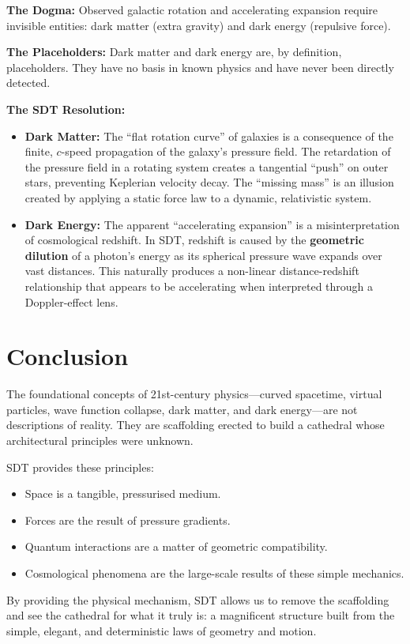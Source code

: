 \textbf{The Dogma:} Observed galactic rotation and accelerating expansion require invisible entities: dark matter (extra gravity) and dark energy (repulsive force).

\textbf{The Placeholders:} Dark matter and dark energy are, by definition, placeholders.  They have no basis in known physics and have never been directly detected.

\textbf{The SDT Resolution:}
\begin{itemize}
  \item \textbf{Dark Matter:} The ``flat rotation curve'' of galaxies is a consequence of the finite, $c$-speed propagation of the galaxy's pressure field.  The retardation of the pressure field in a rotating system creates a tangential ``push'' on outer stars, preventing Keplerian velocity decay.  The ``missing mass'' is an illusion created by applying a static force law to a dynamic, relativistic system.
  \item \textbf{Dark Energy:} The apparent ``accelerating expansion'' is a misinterpretation of cosmological redshift.  In SDT, redshift is caused by the \textbf{geometric dilution} of a photon's energy as its spherical pressure wave expands over vast distances.  This naturally produces a non-linear distance-redshift relationship that appears to be accelerating when interpreted through a Doppler-effect lens.
\end{itemize}


\section{Conclusion}

The foundational concepts of 21st-century physics---curved spacetime, virtual particles, wave function collapse, dark matter, and dark energy---are not descriptions of reality.  They are scaffolding erected to build a cathedral whose architectural principles were unknown.

SDT provides these principles:
\begin{itemize}
  \item Space is a tangible, pressurised medium.
  \item Forces are the result of pressure gradients.
  \item Quantum interactions are a matter of geometric compatibility.
  \item Cosmological phenomena are the large-scale results of these simple mechanics.
\end{itemize}

By providing the physical mechanism, SDT allows us to remove the scaffolding and see the cathedral for what it truly is: a magnificent structure built from the simple, elegant, and deterministic laws of geometry and motion.
